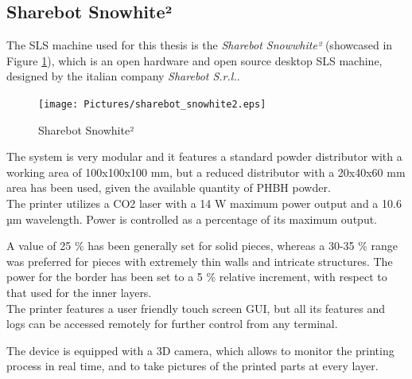 \documentclass[a4paper]{article}
\begin{document}
          
          \clearpage
  
          \subsection{Sharebot Snowhite²\label{Sharebot_Snowhite²}}
  
          The SLS machine used for this thesis is the \textit{Sharebot Snowwhite²} (showcased in Figure \ref{fig:Sharebot_Snowhite2}), which is an open hardware and 
          open source desktop SLS machine, designed by the italian company \textit{Sharebot S.r.l.}. \\ 
  
          \begin{figure}[ht]
              \centering
              \texttt{[image: Pictures/sharebot\_snowhite2.eps]}
              \caption{Sharebot Snowhite²}
              \label{fig:Sharebot_Snowhite2}
          \end{figure}
  
          The system is very modular and it features a standard powder distributor with a working area of 
          100x100x100 mm, but a reduced distributor with a 20x40x60 mm area has been used, given the available 
          quantity of PHBH powder.  \\ 
  
          The printer utilizes a CO2 laser with a 14 W maximum power output and a 10.6 µm wavelength. Power is controlled as 
          a percentage of its maximum output.  
  
          A value of 25 \% has been generally set for solid pieces, whereas a 30-35 \% range was preferred for pieces with extremely thin walls and intricate structures.  
          The power for the border has been set to a 5 \%  relative increment, with respect to that used for the inner layers. \\ 
  
          The printer features a user friendly touch screen GUI, but all its features and logs can be accessed remotely for further control from any terminal.  
  
          The device is equipped with a 3D camera, which allows to monitor the printing process in real time, 
          and to take pictures of the printed parts at every layer. \\
  
\end{document}
